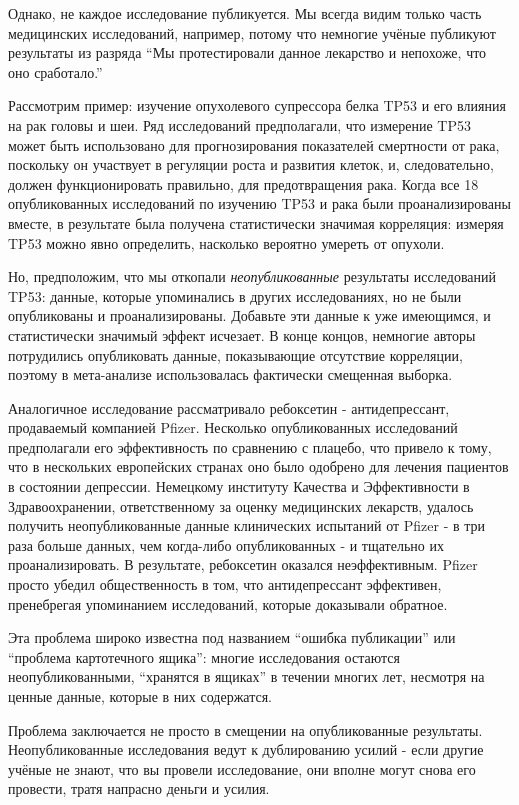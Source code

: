 Однако, не каждое исследование публикуется. Мы всегда видим только часть медицинских исследований, например, потому что немногие учёные публикуют результаты из разряда ``Мы протестировали данное лекарство и непохоже, что оно сработало.''

Рассмотрим пример: изучение опухолевого супрессора белка TP53 и его влияния на рак головы и шеи. Ряд исследований предполагали, что измерение TP53 может быть использовано для прогнозирования показателей смертности от рака, поскольку он участвует в регуляции роста и развития клеток, и, следовательно, должен функционировать правильно, для предотвращения рака. Когда все 18 опубликованных исследований по изучению TP53 и рака были проанализированы вместе, в результате была получена статистически значимая корреляция: измеряя TP53 можно явно определить, насколько вероятно умереть от опухоли.

Но, предположим, что мы откопали \emph{неопубликованные} результаты исследований TP53: данные, которые упоминались в других исследованиях, но не были опубликованы и проанализированы. Добавьте эти данные к уже имеющимся, и статистически значимый эффект исчезает.\cite{kyzas_selective_2005} В конце концов, немногие авторы потрудились опубликовать данные, показывающие отсутствие корреляции, поэтому в мета-анализе использовалась фактически смещенная выборка. 

Аналогичное исследование рассматривало ребоксетин - антидепрессант, продаваемый компанией Pfizer. Несколько опубликованных исследований предполагали его эффективность по сравнению с плацебо, что привело к тому, что в нескольких европейских странах оно было одобрено для лечения пациентов в состоянии депрессии. Немецкому институту Качества и Эффективности в Здравоохранении, ответственному за оценку медицинских лекарств, удалось получить неопубликованные данные клинических испытаний от Pfizer - в три раза больше данных, чем когда-либо опубликованных - и тщательно их проанализировать. В результате, ребоксетин оказался неэффективным. Pfizer просто убедил общественность в том, что антидепрессант эффективен, пренебрегая упоминанием исследований, которые доказывали обратное.\cite{eyding_reboxetine_2010}

Эта проблема широко известна под названием ``ошибка публикации'' или ``проблема картотечного ящика'': многие исследования остаются неопубликованными, ``хранятся в ящиках'' в течении многих лет, несмотря на ценные данные, которые в них содержатся.

Проблема заключается не просто в смещении на опубликованные результаты. Неопубликованные исследования ведут к дублированию усилий - если другие учёные не знают, что вы провели исследование, они вполне могут снова его провести, тратя напрасно деньги и усилия. 

